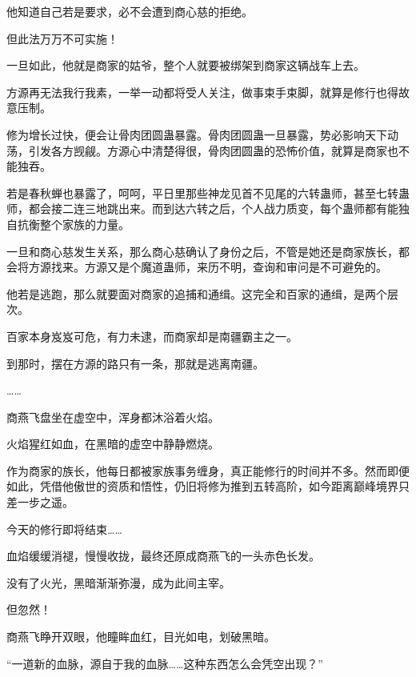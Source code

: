 \begin{this_body}
他知道自己若是要求，必不会遭到商心慈的拒绝。

但此法万万不可实施！

一旦如此，他就是商家的姑爷，整个人就要被绑架到商家这辆战车上去。

方源再无法我行我素，一举一动都将受人关注，做事束手束脚，就算是修行也得故意压制。

修为增长过快，便会让骨肉团圆蛊暴露。骨肉团圆蛊一旦暴露，势必影响天下动荡，引发各方觊觎。方源心中清楚得很，骨肉团圆蛊的恐怖价值，就算是商家也不能独吞。

若是春秋蝉也暴露了，呵呵，平日里那些神龙见首不见尾的六转蛊师，甚至七转蛊师，都会接二连三地跳出来。而到达六转之后，个人战力质变，每个蛊师都有能独自抗衡整个家族的力量。

一旦和商心慈发生关系，那么商心慈确认了身份之后，不管是她还是商家族长，都会将方源找来。方源又是个魔道蛊师，来历不明，查询和审问是不可避免的。

他若是逃跑，那么就要面对商家的追捕和通缉。这完全和百家的通缉，是两个层次。

百家本身岌岌可危，有力未逮，而商家却是南疆霸主之一。

到那时，摆在方源的路只有一条，那就是逃离南疆。

……

商燕飞盘坐在虚空中，浑身都沐浴着火焰。

火焰猩红如血，在黑暗的虚空中静静燃烧。

作为商家的族长，他每日都被家族事务缠身，真正能修行的时间并不多。然而即便如此，凭借他傲世的资质和悟性，仍旧将修为推到五转高阶，如今距离巅峰境界只差一步之遥。

今天的修行即将结束……

血焰缓缓消褪，慢慢收拢，最终还原成商燕飞的一头赤色长发。

没有了火光，黑暗渐渐弥漫，成为此间主宰。

但忽然！

商燕飞睁开双眼，他瞳眸血红，目光如电，划破黑暗。

“一道新的血脉，源自于我的血脉……这种东西怎么会凭空出现？”

\end{this_body}

